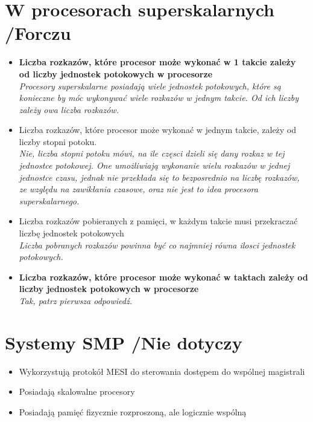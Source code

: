 \documentclass[a4paper,twoside]{article}
\begin{document}
\section{W procesorach superskalarnych {\small /Forczu}}
	\begin{itemize}
    \item \textbf{Liczba rozkazów, które procesor może wykonać w 1 takcie zależy od liczby jednostek potokowych w procesorze}\\
    {\small \emph{Procesory superskalarne posiadają wiele jednostek potokowych, które są konieczne by móc wykonywać wiele rozkazów w jednym takcie. Od ich liczby zależy owa liczba rozkazów.}}
    \item Liczba rozkazów, które procesor może wykonać w jednym takcie, zależy od liczby stopni potoku.\\
    {\small \emph{Nie, liczba stopni potoku mówi, na ile częsci dzieli się dany rozkaz w tej jednostce potokowej. One umożliwiają wykonanie wielu rozkazów w jednej jednostce czasu, jednak nie przekłada się to bezposrednio na liczbę rozkazów, ze względu na zawikłania czasowe, oraz nie jest to idea procesora superskalarnego.}}
    \item Liczba rozkazów pobieranych z pamięci, w każdym takcie musi przekraczać liczbę jednostek potokowych\\
    {\small \emph{Liczba pobranych rozkazów powinna być co najmniej równa ilosci jednostek potokowych.}}
    \item \textbf{Liczba rozkazów, które procesor może wykonać w taktach zależy od liczby jednostek potokowych w procesorze}\\
    {\small \emph{Tak, patrz pierwsza odpowiedź.}}
    \end{itemize}

\section{Systemy SMP {\small /Nie dotyczy}}
	\begin{itemize}
    \item Wykorzystują protokół MESI do sterowania dostępem do wspólnej magistrali
    \item Posiadają skalowalne procesory
    \item Posiadają pamięć fizycznie rozproszoną, ale logicznie wspólną
    \end{itemize}
\end{document}
